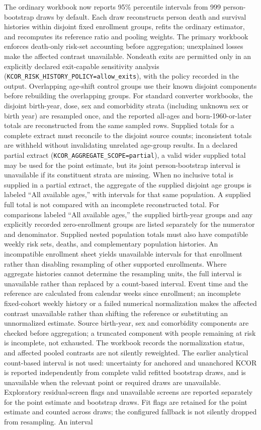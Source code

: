 \documentclass[
]{article}
\begin{document}
The ordinary workbook now reports 95\% percentile intervals from 999 person-bootstrap draws by default. Each draw reconstructs person death and survival histories within disjoint fixed enrollment groups, refits the ordinary estimator, and recomputes its reference ratio and pooling weights. The primary workbook enforces death-only risk-set accounting before aggregation; unexplained losses make the affected contrast unavailable. Nondeath exits are permitted only in an explicitly declared exit-capable sensitivity analysis (\texttt{KCOR\_RISK\_HISTORY\_POLICY=allow\_exits}), with the policy recorded in the output. Overlapping age-shift control groups use their known disjoint components before rebuilding the overlapping groups. For standard converter workbooks, the disjoint birth-year, dose, sex and comorbidity strata (including unknown sex or birth year) are resampled once, and the reported all-ages and born-1960-or-later totals are reconstructed from the same sampled rows. Supplied totals for a complete extract must reconcile to the disjoint source counts; inconsistent totals are withheld without invalidating unrelated age-group results. In a declared partial extract (\texttt{KCOR\_AGGREGATE\_SCOPE=partial}), a valid wider supplied total may be used for the point estimate, but its joint person-bootstrap interval is unavailable if its constituent strata are missing. When no inclusive total is supplied in a partial extract, the aggregate of the supplied disjoint age groups is labeled ``All available ages,'' with intervals for that same population. A supplied full total is not compared with an incomplete reconstructed total. For comparisons labeled ``All available ages,'' the supplied birth-year groups and any explicitly recorded zero-enrollment groups are listed separately for the numerator and denominator. Supplied nested population totals must also have compatible weekly risk sets, deaths, and complementary population histories. An incompatible enrollment sheet yields unavailable intervals for that enrollment rather than disabling resampling of other supported enrollments. Where aggregate histories cannot determine the resampling units, the full interval is unavailable rather than replaced by a count-based interval. Event time and the reference are calculated from calendar weeks since enrollment; an incomplete fixed-cohort weekly history or a failed numerical normalization makes the affected contrast unavailable rather than shifting the reference or substituting an unnormalized estimate. Source birth-year, sex and comorbidity components are checked before aggregation; a truncated component with people remaining at risk is incomplete, not exhausted. The workbook records the normalization status, and affected pooled contrasts are not silently reweighted. The earlier analytical count-based interval is not used: uncertainty for anchored and unanchored KCOR is reported independently from complete valid refitted bootstrap draws, and is unavailable when the relevant point or required draws are unavailable. Exploratory residual-screen flags and unavailable screens are reported separately for the point estimate and bootstrap draws. Fit flags are retained for the point estimate and counted across draws; the configured fallback is not silently dropped from resampling. An interval 
\end{document}
